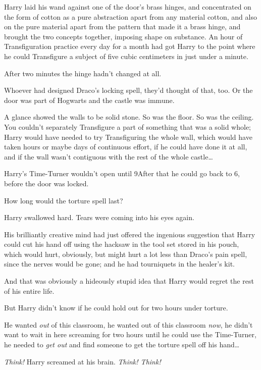 Harry laid his wand against one of the door's brass hinges, and concentrated on the form of cotton as a pure abstraction apart from any material cotton, and also on the pure material apart from the pattern that made it a brass hinge, and brought the two concepts together, imposing shape on substance. An hour of Transfiguration practice every day for a month had got Harry to the point where he could Transfigure a subject of five cubic centimeters in just under a minute.

After two minutes the hinge hadn't changed at all.

Whoever had designed Draco's locking spell, they'd thought of that, too. Or the door was part of Hogwarts and the castle was immune.

A glance showed the walls to be solid stone. So was the floor. So was the ceiling. You couldn't separately Transfigure a part of something that was a solid whole; Harry would have needed to try Transfiguring the whole wall, which would have taken hours or maybe days of continuous effort, if he could have done it at all, and if the wall wasn't contiguous with the rest of the whole castle{\ldots}

Harry's Time-Turner wouldn't open until 9\pm After that he could go back to 6\pm, before the door was locked.

How long would the torture spell last?

Harry swallowed hard. Tears were coming into his eyes again.

His brilliantly creative mind had just offered the ingenious suggestion that Harry could cut his hand off using the hacksaw in the tool set stored in his pouch, which would hurt, obviously, but might hurt a lot less than Draco's pain spell, since the nerves would be gone; and he had tourniquets in the healer's kit.

And that was obviously a hideously stupid idea that Harry would regret the rest of his entire life.

But Harry didn't know if he could hold out for two hours under torture.

He wanted \emph{out} of this classroom, he wanted out of this classroom \emph{now}, he didn't want to wait in here screaming for two hours until he could use the Time-Turner, he needed to \emph{get out} and find someone to get the torture spell off his hand{\ldots}

\emph{Think!} Harry screamed at his brain. \emph{Think! Think!}

\later

